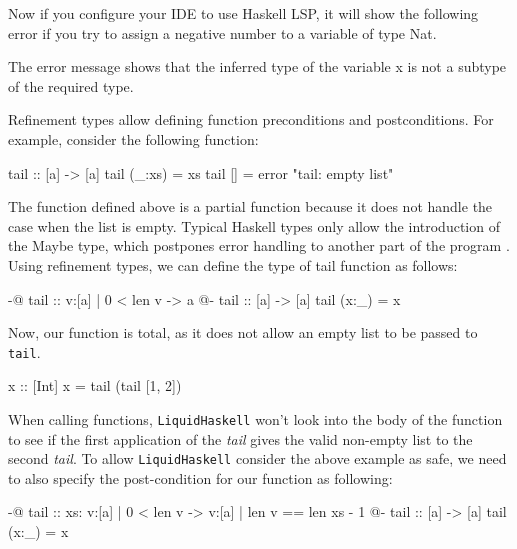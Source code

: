 \documentclass[]{rptuseminar}
\begin{document}
Now if you configure your IDE to use Haskell LSP, it will show the following error if you try to assign a negative number
to a variable of type Nat.


The error message shows that the inferred type of the variable x is not a subtype of the required type.

Refinement types allow defining function preconditions and postconditions\cite{jhala_programming_2020}. 
For example, consider the following function:

\begin{haskell}
 tail :: [a] -> [a]
 tail (_:xs) = xs
 tail [] = error "tail: empty list"
\end{haskell}

The function defined above is a partial function because it does not handle the case when the list is empty. 
 Typical Haskell types only allow the introduction of the Maybe type, which postpones error 
 handling to another part of the program \cite{jhala_programming_2020}. Using refinement types, we can define the type of tail function as follows:

\begin{haskell}
 {-@ tail :: {v:[a] | 0 < len v} -> a @-}
 tail :: [a] -> [a]
 tail (x:_) = x
\end{haskell}

Now, our function is total, as it does not allow an empty list to be passed to \texttt{tail}.

\begin{haskell}
 x :: [Int]
 x = tail (tail [1, 2])
\end{haskell}

When calling functions, \texttt{LiquidHaskell} won't look into the body of the function to see if the first application of the \textit{tail} gives the valid non-empty list to the second \textit{tail}.
To allow \texttt{LiquidHaskell} consider the above example as safe, we need to also specify the post-condition for our function as following:

\begin{haskell}
 {-@ tail :: xs: {v:[a] | 0 < len v} -> {v:[a] | len v == len xs - 1} @-}
 tail :: [a] -> [a]
 tail (x:_) = x
\end{haskell}
\end{document}
